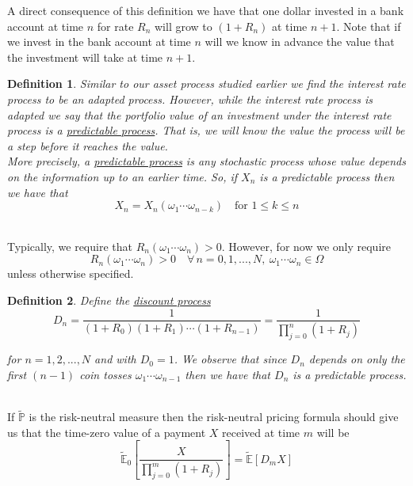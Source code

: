 \documentclass[12pt]{article}
\newtheorem{definition}{Definition}
\newlength\tindent
\renewcommand{\indent}{\hspace*{\tindent}}
\renewcommand{\P}{\mathbb P}
\newcommand{\E}{\mathbb E}
\begin{document}
\indent A direct consequence of this definition we have that one dollar invested in a bank account at time $n$ for rate $R_n$ will grow to $(1 + R_n)$ at time $n + 1$. Note that if we invest in the bank account at time $n$ will we know in advance the value that the investment will take at time $n + 1$. \\

\begin{definition} Similar to our asset process studied earlier we find the interest rate process to be an adapted process. However, while the interest rate process is adapted we say that the portfolio value of an investment under the interest rate process is a \underline{predictable process}. That is, we will know the value the process will be a step before it reaches the value. \\

\indent More precisely, a \underline{predictable process} is any stochastic process whose value depends on the information up to an earlier time. So, if $X_n$ is a predictable process then we have that
\begin{equation*}
	X_n = X_n(\omega_1\cdots\omega_{n - k}) \quad \text{for } 1 \leq k \leq n
\end{equation*}
\end{definition} \hfill\\

Typically, we require that $R_n(\omega_1\cdots\omega_n) > 0$. However, for now we only require
\begin{equation*}
	R_n(\omega_1\cdots\omega_n) > 0 \quad \forall\,n = 0,1,...,N,~\omega_1\cdots\omega_n \in \Omega
\end{equation*}
unless otherwise specified. \\

\begin{definition} Define the \underline{discount process}
\begin{equation*}
	D_n = \frac{1}{ (1 + R_0)(1 + R_1) \cdots (1 + R_{n - 1})} = \frac{1}{ \prod^n_{j = 0} (1 + R_j) }
\end{equation*}

for $n = 1,2,...,N$ and with $D_0 = 1$. We observe that since $D_n$ depends on only the first $(n - 1)$ coin tosses $\omega_1\cdots\omega_{n - 1}$ then we have that $D_n$ is a predictable process.
\end{definition} \hfill\\

\indent If $\tilde{\P}$ is the risk-neutral measure then the risk-neutral pricing formula should give us that the time-zero value of a payment $X$ received at time $m$ will be
\begin{equation*}
	\tilde{\E}_0 \left[ \frac{X}{ \prod^m_{j = 0} (1 + R_j) } \right] = \tilde{\E}[D_m X]
\end{equation*}
\end{document}
